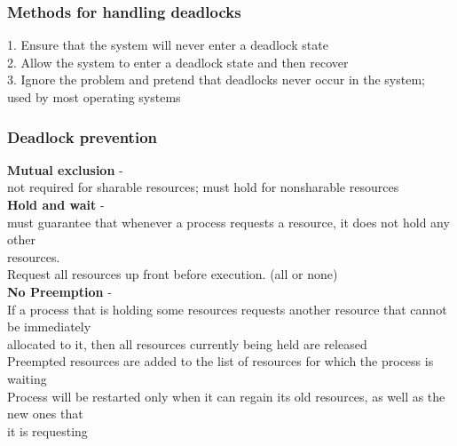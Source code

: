 \documentclass[a4paper,10pt,titlepage]{report}
\begin{document}
\subsubsection{Methods for handling deadlocks}
1. Ensure that the system will never enter a deadlock state\\
2. Allow the system to enter a deadlock state and then recover\\
3. Ignore the problem and pretend that deadlocks never occur in the system; \\
\hspace{10mm} used by most operating systems
\subsubsection{Deadlock prevention}
\textbf{Mutual exclusion }- 
\\ 
\hspace{10mm} not required for sharable resources; must hold for
nonsharable resources
\\
\textbf{Hold and wait} - \\
\hspace{10mm}
must guarantee that whenever a process requests a resource, it does not
hold any other \\
\hspace{10mm} resources.
\\
\hspace{10mm}
Request all resources up front before execution. (all or none)\\

\textbf{No Preemption} - \\
\hspace{10mm}If a process that is holding some resources requests another resource that
cannot be immediately \\
\hspace{10mm}allocated to it, then all resources currently being held
are released\\
\hspace{10mm}Preempted resources are added to the list of resources for which the process
is waiting\\

\hspace{10mm}Process will be restarted only when it can regain its old resources, as well as
the new ones that \\
\hspace{10mm}it is requesting\\
\end{document}
